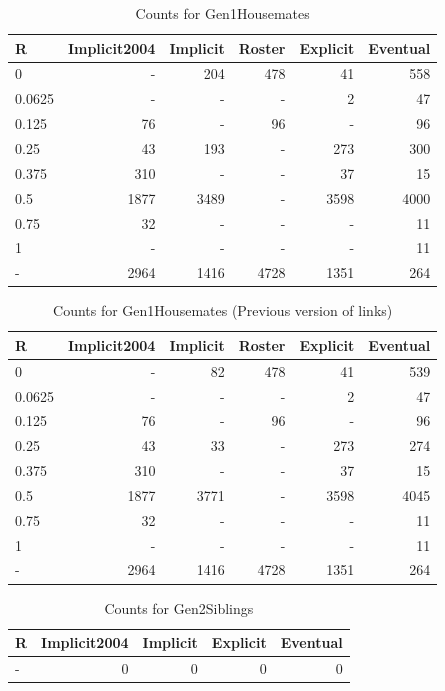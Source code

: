 \documentclass[a4paper]{article}\usepackage[]{graphicx}\usepackage[]{color}
\begin{document}
\begin{table}[ht]
\centering
{\large
\begin{tabular}{lrrrrr}
  \hline
R & Implicit2004 & Implicit & Roster & Explicit & Eventual \\ 
  \hline
0 & - & 204 & 478 &  41 & 558 \\ 
  0.0625 & - & - & - &   2 &  47 \\ 
  0.125 &  76 & - &  96 & - &  96 \\ 
  0.25 &  43 & 193 & - & 273 & 300 \\ 
  0.375 & 310 & - & - &  37 &  15 \\ 
  0.5 & 1877 & 3489 & - & 3598 & 4000 \\ 
  0.75 &  32 & - & - & - &  11 \\ 
  1 & - & - & - & - &  11 \\ 
  - & 2964 & 1416 & 4728 & 1351 & 264 \\ 
   \hline
\end{tabular}
}
\caption{Counts for Gen1Housemates} 
\end{table}
\begin{table}[ht]
\centering
{\large
\begin{tabular}{lrrrrr}
  \hline
R & Implicit2004 & Implicit & Roster & Explicit & Eventual \\ 
  \hline
0 & - &  82 & 478 &  41 & 539 \\ 
  0.0625 & - & - & - &   2 &  47 \\ 
  0.125 &  76 & - &  96 & - &  96 \\ 
  0.25 &  43 &  33 & - & 273 & 274 \\ 
  0.375 & 310 & - & - &  37 &  15 \\ 
  0.5 & 1877 & 3771 & - & 3598 & 4045 \\ 
  0.75 &  32 & - & - & - &  11 \\ 
  1 & - & - & - & - &  11 \\ 
  - & 2964 & 1416 & 4728 & 1351 & 264 \\ 
   \hline
\end{tabular}
}
\caption{Counts for Gen1Housemates (Previous version of links)} 
\end{table}
\begin{table}[ht]
\centering
{\large
\begin{tabular}{lrrrr}
  \hline
R & Implicit2004 & Implicit & Explicit & Eventual \\ 
  \hline
- &   0 &   0 &   0 &   0 \\ 
   \hline
\end{tabular}
}
\caption{Counts for Gen2Siblings} 
\end{table}
\end{document}
